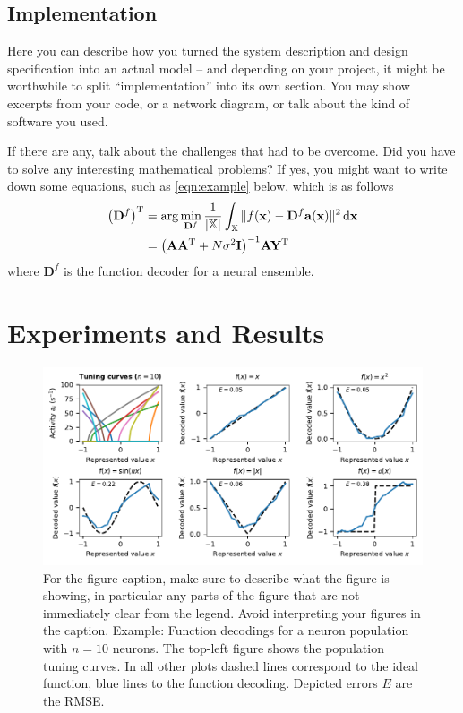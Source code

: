 \documentclass[12pt,letterpaper,oneside]{article}
\renewcommand{\vec}[1]{{\mathbf{#1}}}
\newcommand{\mat}[1]{{\mathbf{#1}}}
\newcommand{\T}{\ensuremath{\mathrm{T}}}
\begin{document}
	\subsection{Implementation}

	Here you can describe how you turned the system description and design specification into an actual model -- and depending on your project, it might be worthwhile to split \enquote{implementation} into its own section. You may show excerpts from your code, or a network diagram, or talk about the kind of software you used.

	If there are any, talk about the challenges that had to be overcome. Did you have to solve any interesting mathematical problems? If yes, you might want to write down some equations, such as \cref{eqn:example} below, which is as follows
	\begin{align}
		\big(\mat D^f\big)^\T &=  \arg\min_{\mat D^f} \frac{1}{|\mathbb{X}|} \int_{\mathbb{X}}  \| f(\vec x) - \mat D^f \vec a(\vec x)\|^2 \, \mathrm{d}\vec x \notag \\
			&= \big(\mat A \mat A^\T + N \sigma^2 \mat I \big)^{-1} \mat A \mat Y^\T
		\label{eqn:example}
	\end{align}
	where $\mat D^f$ is the function decoder for a neural ensemble.

	\section{Experiments and Results}

	\begin{figure}
		\centering
		\includegraphics{media/function_decodings_10.pdf}
		\caption{For the figure caption, make sure to describe what the figure is showing, in particular any parts of the figure that are not immediately clear from the legend. Avoid interpreting your figures in the caption. Example: Function decodings for a neuron population with $n = 10$ neurons. The top-left figure shows the population tuning curves. In all other plots dashed lines correspond to the ideal function, blue lines to the function decoding. Depicted errors $E$ are the RMSE.}
		\label{fig:function_decodings_10.pdf}
	\end{figure}
\end{document}
